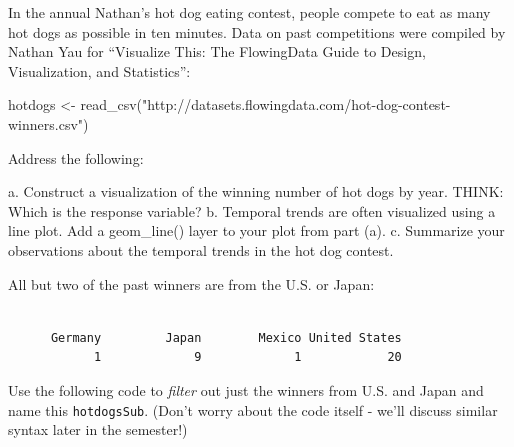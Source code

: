 \documentclass[
  letterpaper,
  DIV=11,
  numbers=noendperiod]{scrreprt}
\newenvironment{Shaded}{\begin{snugshade}}{\end{snugshade}}
\newcommand{\FunctionTok}[1]{\textcolor[rgb]{0.28,0.35,0.67}{#1}}
\newcommand{\NormalTok}[1]{\textcolor[rgb]{0.00,0.23,0.31}{#1}}
\newcommand{\OtherTok}[1]{\textcolor[rgb]{0.00,0.23,0.31}{#1}}
\newcommand{\SpecialCharTok}[1]{\textcolor[rgb]{0.37,0.37,0.37}{#1}}
\newcommand{\StringTok}[1]{\textcolor[rgb]{0.13,0.47,0.30}{#1}}
\begin{document}
In the annual Nathan's hot dog eating contest, people compete to eat as
many hot dogs as possible in ten minutes. Data on past competitions were
compiled by Nathan Yau for ``Visualize This: The FlowingData Guide to
Design, Visualization, and Statistics'':

\begin{Shaded}
\begin{Highlighting}[]
\NormalTok{hotdogs }\OtherTok{\textless{}{-}} \FunctionTok{read\_csv}\NormalTok{(}\StringTok{"http://datasets.flowingdata.com/hot{-}dog{-}contest{-}winners.csv"}\NormalTok{)}
\end{Highlighting}
\end{Shaded}

\begin{Shaded}
\begin{Highlighting}[]
\NormalTok{Address the following:}
   
\NormalTok{a. Construct a visualization of the winning number of hot dogs by year. THINK: Which is the response variable?      }
\NormalTok{b. Temporal trends are often visualized using a line plot.  Add a \textasciigrave{}geom\_line()\textasciigrave{} layer to your plot from part (a).       }
\NormalTok{c. Summarize your observations about the temporal trends in the hot dog contest.    }
\end{Highlighting}
\end{Shaded}

\begin{Shaded}
\begin{Highlighting}[]
\NormalTok{All but two of the past winners are from the U.S. or Japan:}
\end{Highlighting}
\end{Shaded}

\begin{Shaded}
\end{Shaded}

\begin{verbatim}

      Germany         Japan        Mexico United States 
            1             9             1            20 
\end{verbatim}

Use the following code to \emph{filter} out just the winners from U.S.
and Japan and name this \texttt{hotdogsSub}. (Don't worry about the code
itself - we'll discuss similar syntax later in the semester!)
\end{document}

